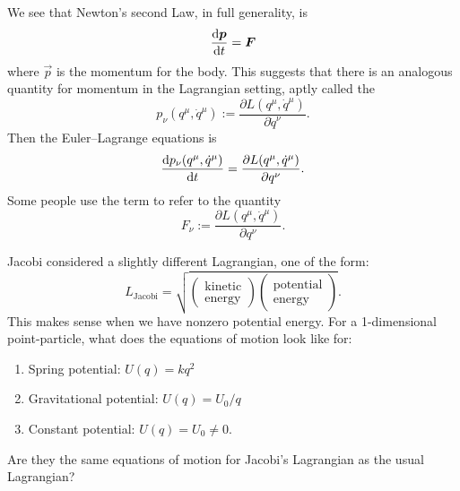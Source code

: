 We see that Newton's second Law, in full generality, is
\begin{equation}
\frac{\mathrm{d}\boldsymbol{p}}{\mathrm{d} t} =\boldsymbol{F}
\end{equation}
where $\vec{p}$ is the momentum for the body. This suggests that there
is an analogous quantity for momentum in the Lagrangian setting, aptly
called the 
\begin{equation}
p_{\nu}(q^{\mu},\dot{q}^{\mu}) := \frac{\partial L(q^{\mu},\dot{q}^{\mu})}{\partial\dot{q}^{\nu}}.
\end{equation}
Then the Euler--Lagrange equations is
\begin{equation}
\frac{\mathrm{d} p_{\nu}(q^{\mu},\dot{q}^{\mu})}{\mathrm{d} t} = \frac{\partial L(q^{\mu},\dot{q}^{\mu})}{\partial q^{\nu}}.
\end{equation}
Some people use the term  to refer to the
quantity
\begin{equation}
F_{\nu} := \frac{\partial L(q^{\mu},\dot{q}^{\mu})}{\partial q^{\nu}}.
\end{equation}

Jacobi considered a slightly different Lagrangian, one of the form:
\begin{equation}
L_{\text{Jacobi}} = \sqrt{\begin{pmatrix}\mbox{kinetic}\\\mbox{energy}\end{pmatrix}\begin{pmatrix}\mbox{potential}\\\mbox{energy}\end{pmatrix}}.
\end{equation}
This makes sense when we have nonzero potential energy. For a
1-dimensional point-particle, what does the equations of motion look
like for:
\begin{enumerate}
\item Spring potential: $U(q)=kq^{2}$
\item Gravitational potential: $U(q) = U_{0}/q$
\item Constant potential: $U(q)=U_{0}\neq0$.
\end{enumerate}
Are they the same equations of motion for Jacobi's Lagrangian as the
usual Lagrangian?

